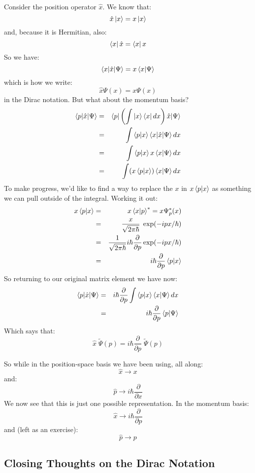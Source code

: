 \documentclass[12pt]{book}
\begin{document}
Consider the position operator $\hat{x}$.  We know that:
$$\hat{x} \ket{x} = x \ket{x}$$
and, because it is Hermitian, also:
$$\bra{x} \hat{x} = \bra{x} x$$
So we have:
$$\braket{x|\hat{x}|\Psi} = x \braket{x|\Psi}$$
which is how we write:
$$\hat{x} \Psi(x) = x \Psi(x)$$
in the Dirac notation.  But what about the momentum basis?  
\begin{eqnarray*}
\braket{p|\hat{x}|\Psi} &=& \braket{p|\left( \int \ket{x}\bra{x}dx \right)\hat{x}|\Psi} \\
&=& \int \braket{p|x}\braket{x|\hat{x}|\Psi} dx\\
&=& \int \braket{p|x}x\braket{x|\Psi} dx\\
&=& \int (x\braket{p|x})\braket{x|\Psi} dx\\
\end{eqnarray*}
To make progress, we'd like to find a way to replace the $x$ in $x\braket{p|x}$ as something we can pull outside of the integral.  Working it out:
\begin{eqnarray*}
  x \braket{p|x} &=& x \braket{x|p}^* = x \Psi_p^*(x) \\
  &=& \frac{x}{\sqrt{2\pi\hbar}} \; \exp(-ipx/\hbar)\\
  &=& \frac{1}{\sqrt{2\pi\hbar}} i\hbar\frac{\partial}{\partial p} \exp(-ipx/\hbar)\\
  &=& i\hbar\frac{\partial}{\partial p} \braket{p|x}\\
\end{eqnarray*}
So returning to our original matrix element we have now:
\begin{eqnarray*}
 \braket{p|\hat{x}|\Psi} &=& i\hbar\frac{\partial}{\partial p} \int \braket{p|x}\braket{x|\Psi} dx\\
&=& i\hbar \frac{\partial}{\partial p} \braket{p|\Psi}
\end{eqnarray*}
Which says that:
$$\hat{x} \; \widetilde{\Psi}(p) = i \hbar \frac{\partial}{\partial p} \; \widetilde{\Psi}(p) $$

So while in the position-space basis we have been using, all along:
$$\hat{x} \longrightarrow x$$
and:
$$\hat{p} \longrightarrow i\hbar\frac{\partial}{\partial x}$$
We now see that this is just one possible representation.  In the momentum basis:
$$\hat{x} \longrightarrow i\hbar \frac{\partial}{\partial p} $$
and (left as an exercise):
$$\hat{p} \longrightarrow p$$

\subsection{Closing Thoughts on the Dirac Notation}
\end{document}
